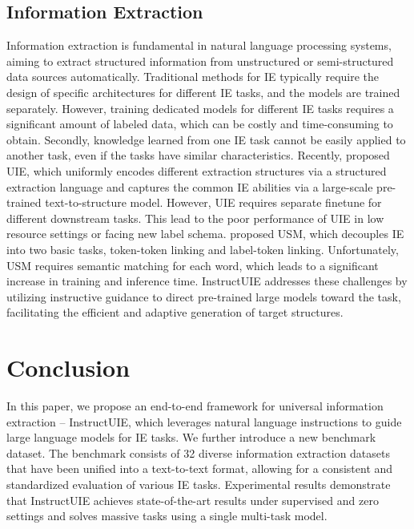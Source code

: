 \subsection{Information Extraction}
Information extraction is fundamental in natural language processing systems, aiming to extract structured information from unstructured or semi-structured data sources automatically. 
Traditional methods \cite{wang-etal-2022-miner,yan-etal-2021-unified,CoNLL2004SOTA,NYT11HRLSOTA} for IE typically require the design of specific architectures for different IE tasks, and the models are trained separately. However, training dedicated models for different IE tasks requires a significant amount of labeled data, which can be costly and time-consuming to obtain. Secondly, knowledge learned from one IE task cannot be easily applied to another task, even if the tasks have similar characteristics. 
Recently, \citet{UIE} proposed UIE, which uniformly encodes different extraction structures via a structured extraction language and captures the common IE abilities via a large-scale pre-trained text-to-structure model. However, UIE requires separate finetune for different downstream tasks. This lead to the poor performance of UIE in low resource settings or facing new label schema. 
\citet{USM} proposed USM, which decouples IE into two basic tasks, token-token linking and label-token linking.  Unfortunately, USM requires semantic matching for each word, which leads to a significant increase in training and inference time.
InstructUIE addresses these challenges by utilizing instructive guidance to direct pre-trained large models toward the task, facilitating the efficient and adaptive generation of target structures.

\section{Conclusion}
In this paper, we propose an end-to-end framework for universal information extraction – InstructUIE, which leverages natural language instructions to guide large language models for IE tasks. 
We further introduce a new benchmark dataset. The benchmark consists of 32 diverse information extraction datasets that have been unified into a text-to-text format, allowing for a consistent and standardized evaluation of various IE tasks.
Experimental results demonstrate that InstructUIE achieves state-of-the-art results under supervised and zero settings and solves massive tasks using a single multi-task model. 

